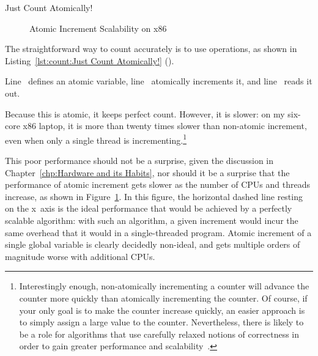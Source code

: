 \begin{listing}

\caption{Just Count Atomically!}
\label{lst:count:Just Count Atomically!}
\end{listing}

\begin{figure}
\centering
{}
\caption{Atomic Increment Scalability on x86}
\label{fig:count:Atomic Increment Scalability on x86}
\end{figure}

The straightforward way to count accurately is to use  operations,
as shown in
Listing~\ref{lst:count:Just Count Atomically!} ().
\begin{fcvref}
Line~ defines an atomic variable,
line~ atomically increments it, and
line~ reads it out.
\end{fcvref}
Because this is atomic, it keeps perfect count.
However, it is slower: on my six-core x86 laptop, it is more than
twenty times slower than non-atomic increment, even
when only a single thread is incrementing.\footnote{
	Interestingly enough, non-atomically incrementing a counter will
	advance the counter more quickly than atomically incrementing
	the counter.
	Of course, if your only goal is to make the counter increase
	quickly, an easier approach is to simply assign a large value
	to the counter.
	Nevertheless, there is likely to be a role for algorithms that
	use carefully relaxed notions of correctness in order to gain
	greater performance and
	scalability~\cite{Andrews91textbook,Arcangeli03,10.5555/3241639.3241645,DavidUngar2011unsync}.}

This poor performance should not be a surprise, given the discussion in
Chapter~\ref{chp:Hardware and its Habits},
nor should it be a surprise that the performance of atomic increment
gets slower as the number of CPUs and threads increase, as shown in
Figure~\ref{fig:count:Atomic Increment Scalability on x86}.
In this figure, the horizontal dashed line resting on the x~axis
is the ideal performance that would be achieved
by a perfectly scalable algorithm: with such an algorithm, a given
increment would incur the same overhead that it would in a single-threaded
program.
Atomic increment of a single global variable is clearly
decidedly non-ideal, and gets multiple orders of magnitude worse with
additional CPUs.

